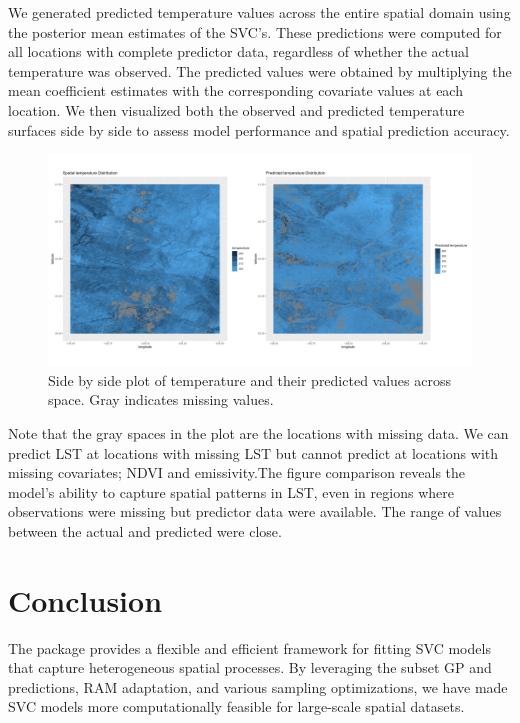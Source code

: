  We generated predicted temperature values across the entire spatial domain using the posterior mean estimates of the SVC's. 
 These predictions were computed for all locations with complete predictor data, regardless of whether the actual temperature was observed. 
 The predicted values were obtained by multiplying the mean coefficient estimates with the corresponding covariate values at each location. 
 We then visualized both the observed and predicted temperature surfaces side by side to assess model performance and spatial prediction accuracy.
 
 
 \begin{figure}[H]
 \centering
 \includegraphics[width=\textwidth]{../../figures/predictions.png}
 \caption{Side by side plot of temperature and their predicted values across space. Gray indicates missing values.}
 \label{fig:predicted temperature}
 \end{figure}
 
 Note that the gray spaces in the plot are the locations with missing data. We can predict LST at locations with missing LST but cannot predict at locations with missing covariates; NDVI and emissivity.The figure comparison reveals the model’s ability to capture spatial patterns in LST, even in regions where observations were missing but predictor data were available.
 The range of values between the actual and predicted were close.
 
\section{Conclusion}
\label{sec:Conclusion}
The  package provides a flexible and efficient framework for fitting SVC models that capture heterogeneous spatial processes. By leveraging the subset GP and predictions, RAM adaptation, and various sampling optimizations, we have made SVC models more computationally feasible for large-scale spatial datasets.


